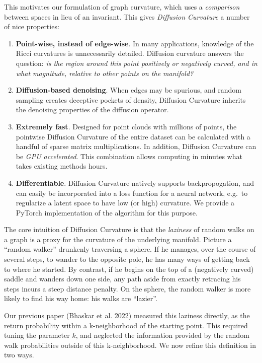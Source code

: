 \documentclass[
  letterpaper,
  DIV=11,
  numbers=noendperiod]{scrartcl}
\theoremstyle{plain}
\theoremstyle{plain}
\theoremstyle{definition}
\theoremstyle{plain}
\theoremstyle{definition}
\theoremstyle{remark}
\begin{document}
This motivates our formulation of graph curvature, which uses a
\emph{comparison} between spaces in lieu of an invariant. This gives
\emph{Diffusion Curvature} a number of nice properties:

\begin{enumerate}
\def\labelenumi{\arabic{enumi}.}
\item
  \textbf{Point-wise, instead of edge-wise}. In many applications,
  knowledge of the Ricci curvatures is unnecessarily detailed. Diffusion
  curvature answers the question: \emph{is the region around this point
  positively or negatively curved, and in what magnitude, relative to
  other points on the manifold?}
\item
  \textbf{Diffusion-based denoising}. When edges may be spurious, and
  random sampling creates deceptive pockets of density, Diffusion
  Curvature inherits the denoising properties of the diffusion operator.
\item
  \textbf{Extremely fast}. Designed for point clouds with millions of
  points, the pointwise Diffusion Curvature of the entire dataset can be
  calculated with a handful of sparse matrix multiplications. In
  addition, Diffusion Curvature can be \emph{GPU accelerated}. This
  combination allows computing in minutes what takes existing methods
  hours.
\item
  \textbf{Differentiable}. Diffusion Curvature natively supports
  backpropogation, and can easily be incorporated into a loss function
  for a neural network, e.g.~to regularize a latent space to have low
  (or high) curvature. We provide a PyTorch implementation of the
  algorithm for this purpose.
\end{enumerate}

The core intuition of Diffusion Curvature is that the \emph{laziness} of
random walks on a graph is a proxy for the curvature of the underlying
manifold. Picture a ``random walker'' drunkenly traversing a sphere. If
he manages, over the course of several steps, to wander to the opposite
pole, he has many ways of getting back to where he started. By contrast,
if he begins on the top of a (negatively curved) saddle and wanders down
one side, any path aside from exactly retracing his steps incurs a steep
distance penalty. On the sphere, the random walker is more likely to
find his way home: his walks are ``lazier''.

Our previous paper (Bhaskar et al. 2022) measured this laziness
directly, as the return probability within a k-neighborhood of the
starting point. This required tuning the parameter \(k\), and neglected
the information provided by the random walk probabilities outside of
this k-neighborhood. We now refine this definition in two ways.
\end{document}
